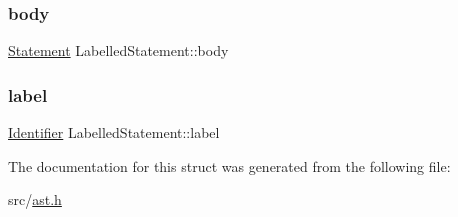 \subsubsection{\texorpdfstring{body}{body}}
{\footnotesize\ttfamily \hyperlink{ast_8h_a8b6ddf3732a0acd77e6b2509fb21a5fd}{Statement} Labelled\+Statement\+::body}

\mbox{\label{struct_labelled_statement_a1f3102a32ae63ed59388b5c2e9292128}} 
\subsubsection{\texorpdfstring{label}{label}}
{\footnotesize\ttfamily \hyperlink{struct_identifier}{Identifier} Labelled\+Statement\+::label}



The documentation for this struct was generated from the following file\+:\begin{DoxyCompactItemize}
\item 
src/\hyperlink{ast_8h}{ast.\+h}\end{DoxyCompactItemize}
